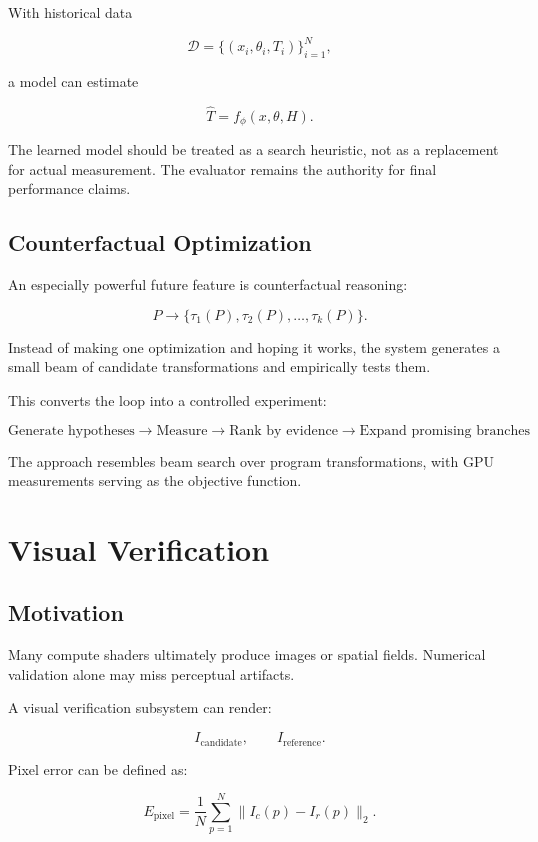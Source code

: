 \documentclass[11pt,a4paper,oneside]{report}
\begin{document}
With historical data

\[
\mathcal{D}
=
\{(x_i,\theta_i,T_i)\}_{i=1}^{N},
\]

a model can estimate

\[
\hat{T}=f_\phi(x,\theta,H).
\]

The learned model should be treated as a search heuristic, not as a replacement for actual
measurement. The evaluator remains the authority for final performance claims.

\section{Counterfactual Optimization}

An especially powerful future feature is counterfactual reasoning:

\[
P
\rightarrow
\{\tau_1(P),\tau_2(P),\ldots,\tau_k(P)\}.
\]

Instead of making one optimization and hoping it works, the system generates a small beam of
candidate transformations and empirically tests them.

This converts the loop into a controlled experiment:

\[
\boxed{
\text{Generate hypotheses}
\rightarrow
\text{Measure}
\rightarrow
\text{Rank by evidence}
\rightarrow
\text{Expand promising branches}
}
\]

The approach resembles beam search over program transformations, with GPU measurements serving
as the objective function.

\chapter{Visual Verification}

\section{Motivation}

Many compute shaders ultimately produce images or spatial fields. Numerical validation alone may
miss perceptual artifacts.

A visual verification subsystem can render:

\[
I_{\mathrm{candidate}},\qquad I_{\mathrm{reference}}.
\]

Pixel error can be defined as:

\begin{equation}
E_{\mathrm{pixel}}
=
\frac{1}{N}
\sum_{p=1}^{N}
\|I_c(p)-I_r(p)\|_2.
\end{equation}
\end{document}
